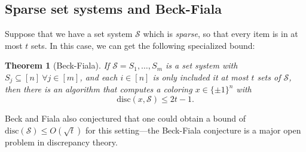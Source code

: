 \documentclass{article}
\theoremstyle{theorem}
\newtheorem{theorem}{Theorem}
\theoremstyle{definition}
\newcommand{\disc}{\mathrm{disc}}
\newcommand{\cS}{\mathcal{S}}
\begin{document}
\subsection*{Sparse set systems and Beck-Fiala}

Suppose that we have a set system $\cS$ which is \emph{sparse}, so that every item is in at most $t$ sets.
In this case, we can get the following specialized bound:
\begin{theorem}[Beck-Fiala]
    If $\cS = S_1,\ldots,S_m$ is a set system with $S_j \subseteq [n] ~ \forall j \in [m]$, and each $i\in[n]$ is only included it at most $t$ sets of $\cS$, then there is an algorithm that computes a coloring $x \in \{\pm 1\}^n$ with
    \[
	\disc(x,\cS) \le 2t - 1.
    \]
\end{theorem}
Beck and Fiala also conjectured that one could obtain a bound of $\disc(\cS) \le O(\sqrt{t})$ for this setting---the Beck-Fiala conjecture is a major open problem in discrepancy theory.
\end{document}
